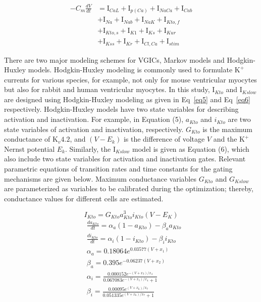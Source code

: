 \documentclass[10pt,letterpaper]{article}
\begin{document}
\begin{equation}
    \begin{split}
    -C_{m}\frac{dV}{dt} &= \text{I}_{CaL}+\text{I}_{p(Ca)}+\text{I}_{NaCa}+\text{I}_{Cab}\\
    &+\text{I}_{Na}+\text{I}_{Nab}+\text{I}_{NaK}+\text{I}_{Kto,f}\\
    &+\text{I}_{Kto,s}+\text{I}_{K1}+\text{I}_{Ks}+\text{I}_{Kur}\\
    &+\text{I}_{Kss}+\text{I}_{Kr}+\text{I}_{Cl,Ca}+\text{I}_{stim}
    \end{split}
    \label{eq4}
\end{equation}

There are two major modeling schemes for VGICs, Markov models and Hodgkin-Huxley models. Hodgkin-Huxley modeling is commonly used to formulate $\text{K}^{+}$ currents for various species, for example, not only for mouse ventricular myocytes but also for rabbit and human ventricular myocytes. In this study, $\text{I}_{Kto}$ and $\text{I}_{Kslow}$ are designed using Hodgkin-Huxley modeling as given in Eq~\ref{eq5} and Eq~\ref{eq6} respectively. Hodgkin-Huxley models have two state variables for describing activation and inactivation. For example, in Equation (5), $a_{Kto}$ and $i_{Kto}$ are two state variables of activation and inactivation, respectively. $G_{Kto}$ is the maximum conductance of $\text{K}_{v}4.2$, and $(V-E_k)$ is the difference of voltage $V$ and the $\text{K}^{+}$ Nernst potential $E_k$. Similarly, the $\text{I}_{Kslow}$ model is given as Equation (6), which also include two state variables for activation and inactivation gates. Relevant parametric equations of transition rates and time constants for the gating mechanisms are given below. Maximum conductance variables $G_{Kto}$ and $G_{Kslow}$ are parameterized as variables to be calibrated during the optimization; thereby, conductance values for different cells are estimated.

\begin{equation}
    I_{Kto} = G_{Kto}a_{Kto}^{3}i_{Kto}(V-E_K)
    \label{eq5}
\end{equation}
\begin{align*}
    &\frac{da_{Kto}}{dt} = \alpha_{a}(1-a_{Kto}) - \beta_{a}a_{Kto} \\
    & \frac{di_{Kto}}{dt} = \alpha_i(1-i_{Kto}) - \beta_i i_{Kto} \\
    &\alpha_a = 0.18064 e^{0.03577(V+x_1)} \\
    &\beta_a = 0.395 e^{-0.06237(V+x_2)} \\
    &\alpha_i = \frac{0.000152 e^{-(V+x_3)/x_4}}{0.067083 e^{-(V + x_5)/x_4} + 1} \\
    &\beta_i = \frac{0.00095 e^{(V+x_6)/x_7}}{0.051335 e^{(V+x_6)/x_7} + 1} \\
\end{align*}
\end{document}
